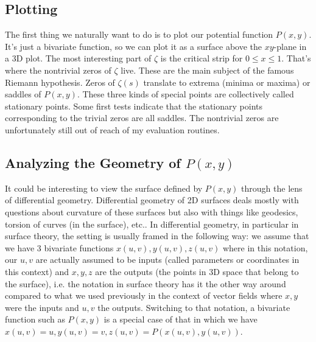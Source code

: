 \documentclass[12pt]{article}
\begin{document}
\subsection{Plotting}
The first thing we naturally want to do is to plot our potential function $P(x,y)$. It's just a bivariate function, so we can plot it as a surface above the $xy$-plane in a 3D plot. The most interesting part of $\zeta$ is the critical strip for $0 \leq x \leq 1$. That's where the nontrivial zeros of $\zeta$ live. These are the main subject of the famous Riemann hypothesis. Zeros of $\zeta(s)$ translate to extrema (minima or maxima) or saddles of $P(x,y)$. These three kinds of special points are collectively called stationary points. Some first tests indicate that the stationary points corresponding to the trivial zeros are all saddles. The nontrivial zeros are unfortunately still out of reach of my evaluation routines.


\subsection{Analyzing the Geometry of $P(x,y)$}
It could be interesting to view the surface defined by $P(x,y)$ through the lens of differential geometry. Differential geometry of 2D surfaces deals mostly with questions about curvature of these surfaces but also with things like geodesics, torsion of curves (in the surface), etc.. In differential geometry, in particular in surface theory, the setting is usually framed in the following way: we assume that we have 3 bivariate functions $x(u,v), y(u,v), z(u,v)$ where in this notation, our $u,v$ are actually assumed to be inputs (called parameters or coordinates in this context) and $x,y,z$ are the outputs (the points in 3D space that belong to the surface), i.e. the notation in surface theory has it the other way around compared to what we used previously in the context of vector fields where $x,y$ were the inputs and $u,v$ the outputs. Switching to that notation, a bivariate function such as $P(x,y)$ is a special case of that in which we have $x(u,v) = u, y(u,v) = v, z(u,v) = P(x(u,v),y(u,v))$.
\end{document}
